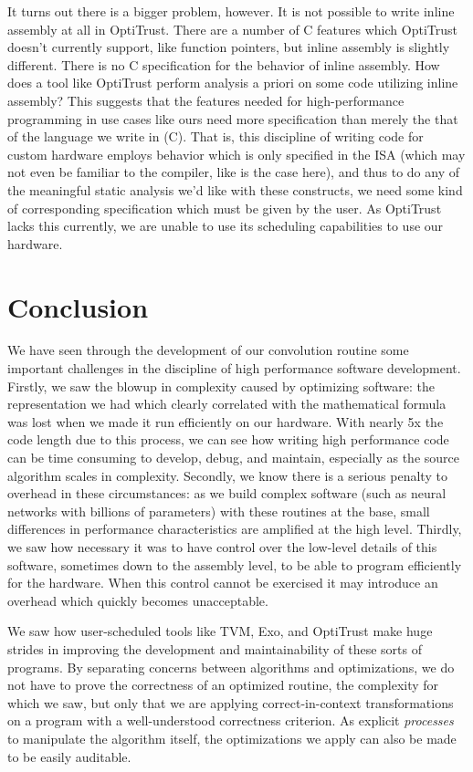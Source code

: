 \documentclass[acmsmall, nonacm=true]{acmart}
\begin{document}
It turns out there is a bigger problem, however. It is not possible to write inline assembly at all in OptiTrust. There are a number of C features which OptiTrust doesn't currently support, like function pointers, but inline assembly is slightly different. There is no C specification for the behavior of inline assembly. How does a tool like OptiTrust perform analysis a priori on some code utilizing inline assembly? This suggests that the features needed for high-performance programming in use cases like ours need more specification than merely the that of the language we write in (C). That is, this discipline of writing code for custom hardware employs behavior which is only specified in the ISA (which may not even be familiar to the compiler, like is the case here), and thus to do any of the meaningful static analysis we'd like with these constructs, we need some kind of corresponding specification which must be given by the user. As OptiTrust lacks this currently, we are unable to use its scheduling capabilities to use our hardware.

\section{Conclusion}

We have seen through the development of our convolution routine some important challenges in the discipline of high performance software development. Firstly, we saw the blowup in complexity caused by optimizing software: the representation we had which clearly correlated with the mathematical formula was lost when we made it run efficiently on our hardware. With nearly 5x the code length due to this process, we can see how writing high performance code can be time consuming to develop, debug, and maintain, especially as the source algorithm scales in complexity. Secondly, we know there is a serious penalty to overhead in these circumstances: as we build complex software (such as neural networks with billions of parameters) with these routines at the base, small differences in performance characteristics are amplified at the high level. Thirdly, we saw how necessary it was to have control over the low-level details of this software, sometimes down to the assembly level, to be able to program efficiently for the hardware. When this control cannot be exercised it may introduce an overhead which quickly becomes unacceptable.

We saw how user-scheduled tools like TVM, Exo, and OptiTrust make huge strides in improving the development and maintainability of these sorts of programs. By separating concerns between algorithms and optimizations, we do not have to prove the correctness of an optimized routine, the complexity for which we saw, but only that we are applying correct-in-context transformations on a program with a well-understood correctness criterion. As explicit \textit{processes} to manipulate the algorithm itself, the optimizations we apply can also be made to be easily auditable. 
\end{document}
